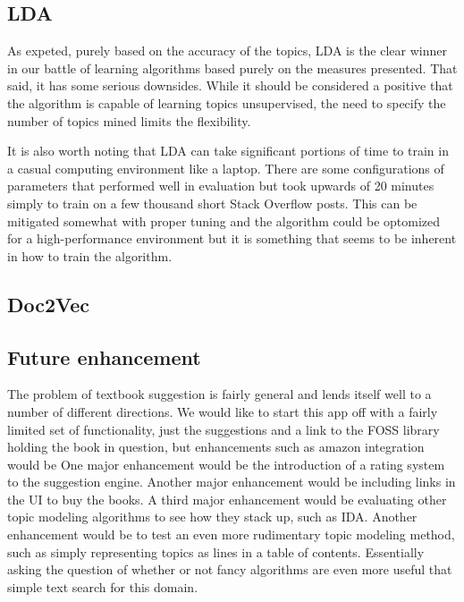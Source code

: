 \subsection{LDA}
\label{sec:conc:lda}
As expeted, purely based on the accuracy of the topics, LDA is the
clear winner in our battle of learning algorithms based purely on the
measures presented.
That said, it has some serious downsides.
While it should be considered a positive that the algorithm is capable
of learning topics unsupervised, the need to specify the number of
topics mined limits the flexibility.

It is also worth noting that LDA can take significant portions of time
to train in a casual computing environment like a laptop.
There are some configurations of parameters that performed well in
evaluation but took upwards of 20 minutes simply to train on a few
thousand short Stack Overflow posts.
This can be mitigated somewhat with proper tuning and the algorithm
could be optomized for a high-performance environment but it is
something that seems to be inherent in how to train the algorithm.

% 
\subsection{Doc2Vec}
\label{sec:conc:doc2vec}



\subsection{Future enhancement}
The problem of textbook suggestion is fairly general and lends itself well to a number of different directions.
We would like to start this app off with a fairly limited set of functionality, just the suggestions and a link to the FOSS library holding the book in question, but enhancements such as amazon integration would be 
One major enhancement would be the introduction of a rating system to the suggestion engine.  
Another major enhancement would be including links in the UI to buy the books.
A third major enhancement would be evaluating other topic modeling algorithms to see how they stack up, such as IDA.
Another enhancement would be to test an even more rudimentary topic modeling method, such as simply representing topics as lines in a table of contents.  
Essentially asking the question of whether or not fancy algorithms are
even more useful that simple text search for this domain.


 